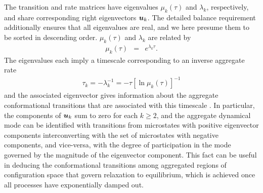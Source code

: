 The transition and rate matrices have eigenvalues $\mu_k(\tau)$ and $\lambda_k$, respectively, and share corresponding right eigenvectors ${\mbox{\boldmath{$u$}}}_k$.
The detailed balance requirement additionally ensures that all eigenvalues are real, and we here presume them to be sorted in descending order.
$\mu_k(\tau)$ and $\lambda_k$ are related by
\begin{eqnarray}
\mu_k(\tau) &=& e^{\lambda_k \tau} . \label{automatic:equation:implied-timescales-relation}
\end{eqnarray}
The eigenvalues each imply a timescale corresponding to an inverse aggregate rate
\begin{eqnarray}
\tau_k = - \lambda_k^{-1} = - \tau [ \ln \mu_k(\tau) ]^{-1} \label{automatic:equation:implied-timescales}
\end{eqnarray}
and the associated eigenvector gives information about the aggregate conformational transitions that are associated with this timescale \cite{schuette-thesis,schuette:1999a,huisinga-thesis,schuette:2002a}.
In particular, the components of ${\mbox{\boldmath{$u$}}}_k$ sum to zero for each $k \ge 2$, and the aggregate dynamical mode can be identified with transitions from microstates with positive eigenvector components interconverting with the set of microstates with negative components, and vice-versa, with the degree of participation in the mode governed by the magnitude of the eigenvector component.
This fact can be useful in deducing the conformational transitions among aggregated regions of configuration space that govern relaxation to equilibrium, which is achieved once all processes have exponentially damped out.

